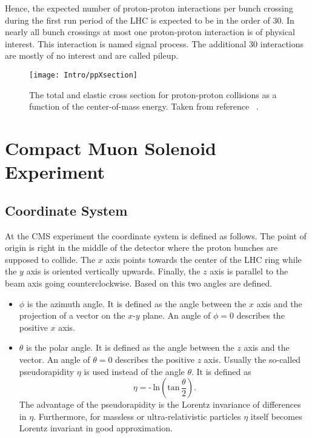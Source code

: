 Hence, the expected number of proton-proton interactions per bunch crossing during the first run period of the LHC is expected to be in the order of 30. In nearly all bunch crossings at most one proton-proton interaction is of physical interest. This interaction is named signal process. The additional 30 interactions are mostly of no interest and are called pileup.

\begin{figure}[Htb]
    \centering
    \texttt{[image: Intro/ppXsection]}
    \caption[Total and elastic cross section for pp interactions]{The total and elastic cross section for proton-proton collisions as a function of the center-of-mass energy. Taken from reference ~.\label{plot:IntroTotalCross}}
\end{figure}

\section{Compact Muon Solenoid Experiment \label{LHCCMSCMS}}

\subsection{Coordinate System \label{LCHCMSCoordSys}}

At the CMS experiment the coordinate system is defined as follows. The point of origin is right in the middle of the detector where the proton bunches are supposed to collide. The $x$ axis points towards the center of the LHC ring while the $y$ axis is oriented vertically upwards. Finally, the $z$ axis is parallel to the beam axis going counterclockwise. Based on this two angles are defined.
\begin{itemize}
    \item{$\phi{}$} is the azimuth angle. It is defined as the angle between the $x$ axis and the projection of a vector on the $x$-$y$ plane. An angle of $\phi{} = 0$ describes the positive $x$ axis.
    \item{$\theta{}$} is the polar angle. It is defined as the angle between the $z$ axis and the vector. An angle of $\theta{} = 0$ describes the positive $z$ axis. Usually the so-called pseudorapidity $\eta{}$ is used instead of the angle $\theta$. It is defined as
    \begin{equation}
        \eta{} = \textrm{-}\,{}\textrm{ln} \left( \textrm{tan}\,{}\frac{\theta{}}{2}\right).
        \label{eq:pseudorapidity}
    \end{equation}
    The advantage of the pseudorapidity is the Lorentz invariance of differences in $\eta{}$. Furthermore, for massless or ultra-relativistic particles $\eta$ itself becomes Lorentz invariant in good approximation.
\end{itemize}

